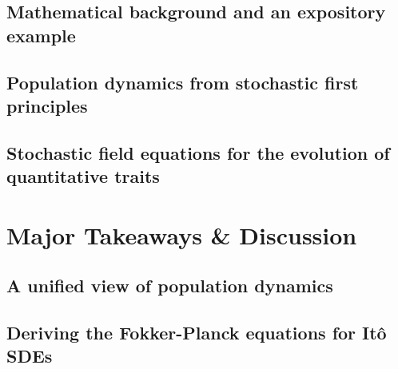 \documentclass[twoside, 12pt]{iiser-thesis-modified} %
\begin{document}
\chapter{Mathematical background and an expository example}\label{chap_math_background}

\chapter{Population dynamics from stochastic first principles}\label{chap_BD}

\chapter{Stochastic field equations for the evolution of quantitative traits}\label{chap_infD_processes}


\cleardoublepage
\begingroup
\makeatletter
\let\ps@plain\ps@empty
\part{Major Takeaways \& Discussion}\label{part_summary}
\endgroup

\chapter{A unified view of population dynamics}\label{chap_unification}


\cleardoublepage
\null\thispagestyle{plain}\newpage
\ifodd\value{page}\else\null\thispagestyle{plain}\newpage\fi

\cleardoublepage
{}
\appendix
{}

\renewcommand{\chaptername}{Appendix}

\chapter{Deriving the Fokker-Planck equations for It\^{o} SDEs}\label{App_SDE_FPE}

\end{document}
